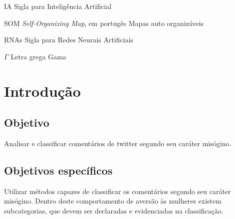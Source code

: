 \documentclass[
	12pt,				%
	openright,			%
	twoside,			%
	a4paper,			%
	english,			%
	french,				%
	spanish,			%
	brazil				%
	]{abntex2}
\begin{document}
\listoftables*

\cleardoublepage

\begin{siglas}
  \item[IA] Sigla para Inteligência Artificial
  \item[SOM] \emph{Self-Organizing Map}, em portugês Mapas auto organizáveis
  \item[RNAs] Sigla para Redes Neurais Artificiais
  
\end{siglas}

\begin{simbolos}
  \item[$ \Gamma $] Letra grega Gama
  
\end{simbolos}

\tableofcontents*
\cleardoublepage



\textual

\chapter{Introdução}

\section{Objetivo}
Analisar e classificar comentários de twitter segundo seu caráter misógino.
\section{Objetivos específicos}
Utilizar métodos capazes de classificar os comentários segundo seu caráter misógino.
Dentro deste comportamento de aversão às mulheres existem subcategorias, que devem ser declaradas e evidenciadas na classificação.
\end{document}
